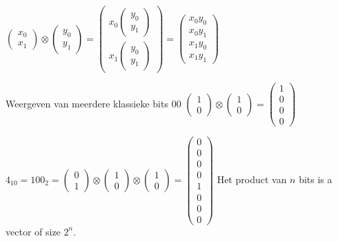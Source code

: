 $\begin{pmatrix}
x_0\\
x_1
\end{pmatrix}
\otimes
\begin{pmatrix}
y_0\\
y_1
\end{pmatrix}
=
\begin{pmatrix}
x_0 \begin{pmatrix}
y_0\\
y_1
\end{pmatrix}
\\
x_1\begin{pmatrix}
y_0\\
y_1
\end{pmatrix}

\end{pmatrix}
=
\begin{pmatrix}
x_0y_0\\
x_0y_1\\
x_1y_0\\
x_1y_1
\end{pmatrix}
$
 
Weergeven van meerdere klassieke bits
00
$\begin{pmatrix}
1\\
0
\end{pmatrix}
\otimes
\begin{pmatrix}
1\\
0
\end{pmatrix}
=
\begin{pmatrix}
1\\
0\\
0\\
0
\end{pmatrix}
$

$4_{10}=100_{2}=
\begin{pmatrix}
0\\
1
\end{pmatrix}
\otimes
\begin{pmatrix}
1\\
0
\end{pmatrix}
\otimes
\begin{pmatrix}
1\\
0
\end{pmatrix}
=
\begin{pmatrix}
0\\
0\\
0\\
0\\
1\\
0\\
0\\
0
\end{pmatrix}
$
Het product van $n$ bits is a vector of size $2^n$. 


